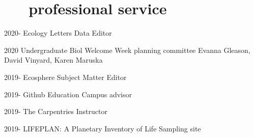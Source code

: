 \documentclass[]{CV}
\begin{document}














\section{ \faUserPlus \ \ \ professional service}

\begin{entrylist}

 \entry
	 {2020-}
	 {Ecology Letters}
	 {Data Editor}

 \entry
	 {2020}
	 {Undergraduate Biol Welcome Week planning committee}
	 {Evanna Gleason, David Vinyard, Karen Maruska}
	 
 \entry
	 {2019-}
	 {Ecosphere}
	 {Subject Matter Editor}

 \entry
	 {2019-}
	 {Github Education}
	 {Campus advisor}

 \entry
	 {2019-}
	 {The Carpentries}
	 {Instructor}

 \entry
	 {2019-}
	 {LIFEPLAN: A Plan­et­ary In­vent­ory of Life}
	 {Sampling site}

\end{entrylist}
\end{document}
